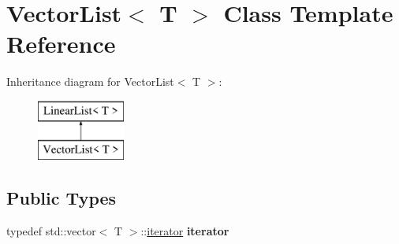 \hypertarget{classVectorList}{}\section{Vector\+List$<$ T $>$ Class Template Reference}
\label{classVectorList}
Inheritance diagram for Vector\+List$<$ T $>$\+:\begin{figure}[H]
\begin{center}
\leavevmode
\includegraphics[height=2.000000cm]{classVectorList}
\end{center}
\end{figure}
\subsection*{Public Types}
\begin{DoxyCompactItemize}
\item 
\mbox{\label{classVectorList_a9aa89b0156dca1ebe731f2296e7a5e38}} 
typedef std\+::vector$<$ T $>$\+::\hyperlink{classiterator}{iterator} {\bfseries iterator}
\end{DoxyCompactItemize}
